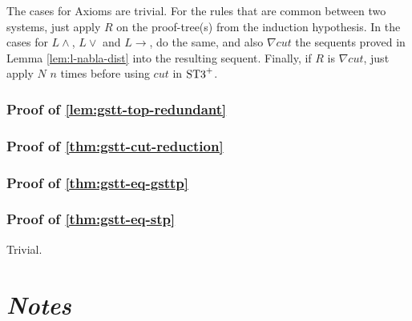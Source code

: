 \documentclass[a4paper, 12pt]{paper}
\begin{document}
The cases for Axioms are trivial.
For the rules that are common between two systems, just apply $R$ on the proof-tree(s) from the induction hypothesis.
In the cases for $L \wedge$, $L \vee$ and $L \rightarrow$, do the same, and also $\nabla cut$ the sequents proved in Lemma \ref{lem:l-nabla-dist} into the resulting sequent. Finally, if $R$ is $\nabla cut$, just apply $N$ $n$ times before using $cut$ in $\text{ST3}^+$.


\section{Proof of \ref{lem:gstt-top-redundant}}\label{pr:gstt-top-redundant}




\section{Proof of \ref{thm:gstt-cut-reduction}}\label{pr:gstt-cut-reduction}




\section{Proof of \ref{thm:gstt-eq-gsttp}}\label{pr:gstt-eq-gsttp}




\section{Proof of \ref{thm:gstt-eq-stp}}\label{pr:gstt-eq-stp}
Trivial.



\pagebreak

\part*{\emph{Notes}}
\end{document}
